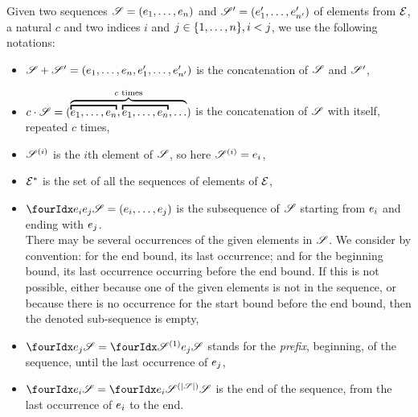 Given two sequences $\defSeq{1}{n}$ and $\defSeq[\seq'][\sit']{1}{n'}$ of elements from $\mathcal{E}$, a natural $c$ and two indices $i$ and $j \in \{1, \dots, n\}, i < j$, we use the following notations:
\begin{itemize}
  \item $\seq \concat \seq' = (\elemsSeq{1}{n}, \elemsSeq[\sit']{1}{n'})$ is the concatenation of $\seq$ and $\seq'$,
  \item $c \cdot \seq = (\overbrace{\overbracket{\elemsSeq{1}{n}}, \overbracket{\elemsSeq{1}{n}}, {\dots}}^{c \text{ times}})$ is the concatenation of $\seq$ with itself, repeated $c$ times,
  \item $\seq[i]$ is the $i$th element of $\seq$, so here $\seq[i] = \sit_i$, 
  \item $\mathcal{E}^*$ is the set of all the sequences of elements of $\mathcal{E}$,
  \item $\slice{\sit_i}{\sit_j} = \bodySeq{i}{j}$ is the subsequence of $\seq$ starting from $e_i$ and ending with $e_j$.\\
    There may be several occurrences of the given elements in $\seq$.
    We consider by convention: for the end bound, its last occurrence; and for the beginning bound, its last occurrence occurring before the end bound.
    If this is not possible, either because one of the given elements is not in the sequence, or because there is no occurrence for the start bound before the end bound, then the denoted sub-sequence is empty,
  \item $\slice{}{\sit_j} = \slice{\seq[1]}{\sit_j}$ stands for the \emph{prefix},  beginning, of the sequence, until the last occurrence of $e_j$,
  \item $\slice{\sit_i}{} = \slice{\sit_i}{\seq[\card{\seq}]}$ is the end of the sequence, from the last occurrence of $e_i$ to the end.
\end{itemize}



